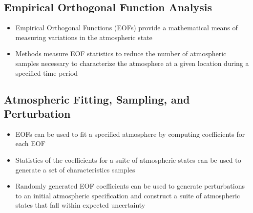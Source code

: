 \documentclass[letterpaper,10pt,english]{sphinxmanual}
\begin{document}
\subsection{Empirical Orthogonal Function Analysis}
\label{\detokenize{analysis:eofs}}\begin{itemize}
\item {} 
Empirical Orthogonal Functions (EOFs) provide a mathematical means of measuring variations in the atmospheric state

\item {} 
Methods measure EOF statistics to reduce the number of atmospheric samples necessary to characterize the atmosphere at a given location during a specified time period

\end{itemize}


\subsection{Atmospheric Fitting, Sampling, and Perturbation}
\label{\detokenize{analysis:sampling}}\begin{itemize}
\item {} 
EOFs can be used to fit a specified atmosphere by computing coefficients for each EOF

\item {} 
Statistics of the coefficients for a suite of atmospheric states can be used to generate a set of characteristics samples

\item {} 
Randomly generated EOF coefficients can be used to generate perturbations to an initial atmospheric specification and construct a suite of atmospheric states that fall within expected uncertainty

\end{itemize}
\end{document}
